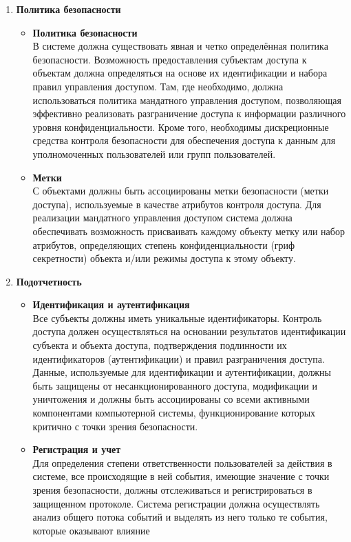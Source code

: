 \begin{enumerate}
	\item \textbf{Политика безопасности}
	\begin{itemize}
		\item \textbf{Политика безопасности}\\
		В системе должна существовать явная и четко определённая политика безопасности. Возможность предоставления субъектам доступа к объектам должна определяться на основе
		их идентификации и набора правил управления доступом. Там, где необходимо, должна использоваться политика мандатного управления доступом, позволяющая эффективно реализовать
		разграничение доступа к информации различного уровня конфиденциальности. Кроме того, необходимы дискреционные средства контроля безопасности для обеспечения доступа к данным для
		уполномоченных пользователей или групп пользователей.
		\item \textbf{Метки}\\
		С объектами должны быть ассоциированы метки безопасности (метки доступа), используемые в качестве атрибутов контроля доступа. Для реализации мандатного управления доступом система
		должна обеспечивать возможность присваивать каждому объекту метку или набор атрибутов, определяющих степень конфиденциальности (гриф секретности) объекта и/или режимы доступа к
		этому объекту.
	\end{itemize}
	\item \textbf{Подотчетность}
	\begin{itemize}
		\item \textbf{Идентификация и аутентификация}\\
		Все субъекты должны иметь уникальные идентификаторы. Контроль доступа должен осуществляться на основании результатов идентификации субъекта и объекта доступа, подтверждения
		подлинности их идентификаторов (аутентификации) и правил разграничения доступа. Данные, используемые для идентификации и аутентификации, должны быть защищены от несанкционированного
		доступа, модификации и уничтожения и должны быть ассоциированы со всеми активными компонентами компьютерной системы, функционирование которых критично с точки зрения безопасности.
		\item \textbf{Регистрация и учет}\\
		Для определения степени ответственности пользователей за действия в системе, все происходящие в ней события, имеющие значение с точки зрения безопасности, должны отслеживаться и
		регистрироваться в защищенном протоколе. Система регистрации должна осуществлять анализ общего потока событий и выделять из него только те события, которые оказывают влияние

\end{itemize}
\end{enumerate}
